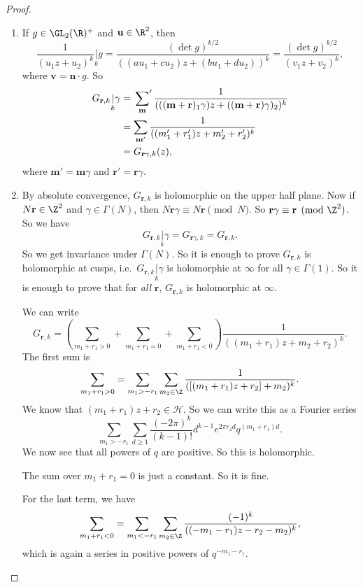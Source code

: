 \documentclass[a4paper]{article}
\renewcommand{\H}{\mathcal{H}}
\begin{document}
\begin{proof}\leavevmode
  \begin{enumerate}
    \item If $g \in \GL_2(\R)^+$ and $\mathbf{u} \in \R^2$, then
      \[
        \frac{1}{(u_1 z + u_2)^k} \underset{k}{|} g = \frac{(\det g)^{k/2}}{ ((au_1 + cu_2) z + (bu_1 + d u_2))^k} = \frac{(\det g)^{k/2}}{(v_1 z + v_2)^k},
      \]
      where $\mathbf{v} = \mathbf{n}\cdot g$. So
      \begin{align*}
        G_{\mathbf{r}, k} \underset{k}{|}\gamma &= \sideset{}{'}\sum_{\mathbf{m}}\frac{1}{(((\mathbf{m} + \mathbf{r})_1 \gamma) z + ((\mathbf{m} + \mathbf{r})\gamma)_2)^k} \\
        &= \sum_{\mathbf{m}'} \frac{1}{((m_1' + r_1') z + m_2' + r_2')^k}\\
        &= G_{\mathbf{r} \gamma, k}(z),
      \end{align*}
      where $\mathbf{m}' = \mathbf{m} \gamma$ and $\mathbf{r}' = \mathbf{r} \gamma$.
    \item By absolute convergence, $G_{\mathbf{r}, k}$ is holomorphic on the upper half plane. Now if $N\mathbf{r} \in \Z^2$ and $\gamma \in \Gamma(N)$, then $N\mathbf{r} \gamma \equiv N\mathbf{r} \pmod N$. So $\mathbf{r} \gamma \equiv \mathbf{r} \pmod {\Z^2}$. So we have
      \[
        G_{\mathbf{r}, k}\underset{k}{|}\gamma = G_{\mathbf{r} \gamma, k} = G_{\mathbf{r}, k}.
      \]
      So we get invariance under $\Gamma(N)$. So it is enough to prove $G_{\mathbf{r}, k}$ is holomorphic at cusps, i.e.\ $G_{\mathbf{r}, k}\underset{k}{|} \gamma$ is holomorphic at $\infty$ for all $\gamma \in \Gamma(1)$. So it is enough to prove that for \emph{all} $\mathbf{r}$, $G_{\mathbf{r}, k}$ is holomorphic at $\infty$.

      We can write
      \[
        G_{\mathbf{r}, k} = \left(\sum_{m_1 + r_1 > 0} + \sum_{m_1 + r_1 = 0} + \sum_{m_1 + r_1 < 0}\right)\frac{1}{((m_1 + r_1) z + m_2 + r_2)^k}.
      \]
      The first sum is
      \[
        \sum_{m_1 + r_1 > 0} = \sum_{m_1 > - r_1} \sum_{m_2 \in \Z} \frac{1}{([(m_1 + r_1) z + r_2] + m_2)^k}.
      \]
      We know that $(m_1 + r_1)z + r_2 \in \H$. So we can write this as a Fourier series
      \[
        \sum_{m_1 > -r_1} \sum_{d \geq 1} \frac{(-2\pi)^k}{(k - 1)!} d^{k - 1} e^{2\pi r_2 d} q^{(m_1 + r_1) d}.
      \]
      We now see that all powers of $q$ are positive. So this is holomorphic.

      The sum over $m_1 + r_1 = 0$ is just a constant. So it is fine.

      For the last term, we have
      \[
        \sum_{m_1 + r_1 < 0} = \sum_{m_1 < - r_1} \sum_{m_2 \in \Z} \frac{(-1)^k}{((-m_1 - r_1)z - r_2 - m_2)^k},
      \]
      which is again a series in positive powers of $q^{-m_1 - r_1}$.
  \end{enumerate}
\end{proof}
\end{document}
